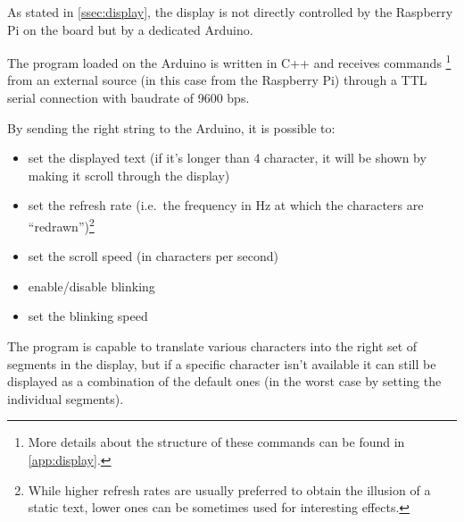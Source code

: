 As stated in \autoref{ssec:display}, the display is not directly controlled by
the Raspberry Pi on the board but by a dedicated Arduino.

The program loaded on the Arduino is written in C++ and receives commands%
\footnote{More details about the structure of these commands can be found in
\autoref{app:display}.} from an external source (in this case from the Raspberry
Pi) through a TTL serial connection with baudrate of 9600 bps.

\beforelist By sending the right string to the Arduino, it is possible to:
\begin{itemize}
\item set the displayed text (if it's longer than 4 character, it will be
  shown by making it scroll through the display)
\item set the refresh rate (i.e.\ the frequency in Hz at which the characters
  are ``redrawn'')\footnote{While higher refresh rates are usually preferred to
  obtain the illusion of a static text, lower ones can be sometimes used for
  interesting effects.}
\item set the scroll speed (in characters per second)
\item enable/disable blinking
\item set the blinking speed
\end{itemize}
\afterlist*
The program is capable to translate various characters into the right set of
segments in the display, but if a specific character isn't available it can
still be displayed as a combination of the default ones (in the worst case by
setting the individual segments).
